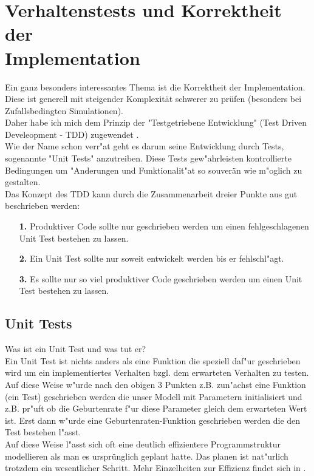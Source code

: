 \documentclass[11pt, a4paper, german]{article}
\theoremstyle{plain}
\begin{document}
\clearpage
\section{Verhaltenstests und Korrektheit der \\Implementation}
Ein ganz besonders interessantes Thema ist die Korrektheit der Implementation. Diese ist generell mit steigender Komplexität schwerer zu prüfen (besonders bei Zufallsbedingten Simulationen).\\
Daher habe ich mich dem Prinzip der "{}Testgetriebene Entwicklung"{}  (Test Driven Develeopment - TDD) zugewendet \cite{martin2007professionalism}.\\
Wie der Name schon verr"at geht es darum seine Entwicklung durch Tests, sogenannte "{}Unit Tests"{} anzutreiben. Diese Tests gew"ahrleisten kontrollierte Bedingungen um "Anderungen und Funktionalit"at so souverän wie m"oglich zu gestalten.\\
Das Konzept des TDD kann durch die Zusammenarbeit dreier Punkte aus \cite{martin2008clean} gut beschrieben werden:
\begin{itemize}
	\item[\textbf{1.}] Produktiver Code sollte nur geschrieben werden um einen fehlgeschlagenen Unit Test bestehen zu lassen.
	\item[\textbf{2.}] Ein Unit Test sollte nur soweit entwickelt werden bis er fehlschl"agt.
	\item[\textbf{3.}] Es sollte nur so viel produktiver Code geschrieben werden um einen Unit Test bestehen zu lassen. \label{3Punkte}
\end{itemize}

	\subsection{Unit Tests}
	Was ist ein Unit Test und was tut er?\\
	Ein Unit Test ist nichts anders als eine Funktion die speziell daf"ur geschrieben wird um ein implementiertes Verhalten bzgl. dem erwarteten Verhalten zu testen.\\ 
	Auf diese Weise w"urde nach den obigen 3 Punkten z.B. zun"achst eine Funktion (ein Test) geschrieben werden die unser Modell mit Parametern initialisiert und z.B. pr"uft ob die Geburtenrate f"ur diese Parameter gleich dem erwarteten Wert ist. Erst dann w"urde eine Geburtenraten-Funktion geschrieben werden die den Test bestehen l"asst.\\ 
	Auf diese Weise l"asst sich oft eine deutlich effizientere Programmstruktur modellieren als man es ursprünglich geplant hatte. Das planen ist nat"urlich trotzdem ein wesentlicher Schritt. Mehr Einzelheiten zur Effizienz findet sich in \cite[The Bowling Game: An example of test-first pair programming]{martin2008clean}.
	
\end{document}
